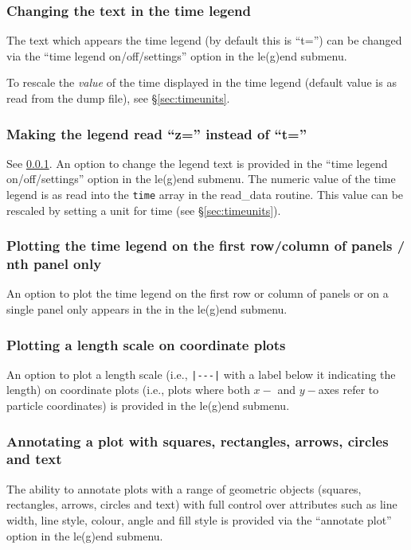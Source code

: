 \documentclass[a4paper,10pt]{article}
\begin{document}
\subsubsection{ Changing the text in the time legend}
\label{sec:timelegendtext}
 The text which appears the time legend (by default this is ``t='') can be changed via the  ``time legend on/off/settings'' option in the le(g)end submenu.

 To rescale the \emph{value} of the time displayed in the time legend (default value is as read from the dump file), see \S\ref{sec:timeunits}.
 
\subsubsection{ Making the legend read ``z='' instead of ``t=''}
 See \ref{sec:timelegendtext}. An option to change the legend text is provided in the  ``time legend on/off/settings'' option in the le(g)end submenu. The numeric value of the time legend is as read into the \verb+time+ array in the read\_data routine. This value can be rescaled by setting a unit for time (see \S\ref{sec:timeunits}). 
  
\subsubsection{ Plotting the time legend on the first row/column of panels / nth panel only}
 An option to plot the time legend on the first row or column of panels or on a single panel only appears in the in the le(g)end submenu.

\subsubsection{ Plotting a length scale on coordinate plots}
 An option to plot a length scale (i.e., \verb+|---|+ with a label below it indicating the length) on coordinate plots (i.e., plots where both $x-$ and $y-$axes refer to particle coordinates) is provided in the le(g)end submenu.

\subsubsection{ Annotating a plot with squares, rectangles, arrows, circles and text}
 The ability to annotate plots with a range of geometric objects (squares, rectangles, arrows, circles and text) with full control over attributes such as line width, line style, colour, angle and fill style is provided via the ``annotate plot'' option in the le(g)end submenu.
 
\end{document}
